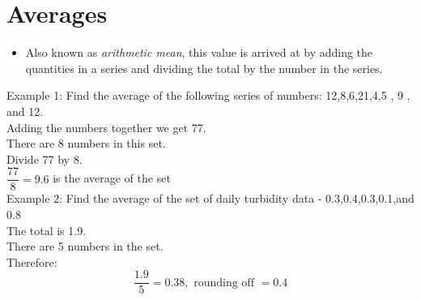 \section{Averages}
\begin{itemize}
\item Also known as \emph{arithmetic mean}, this value is arrived at by adding the quantities in a series and dividing the total by the number in the series.
\end{itemize}
Example 1: Find the average of the following series of numbers: 12,8,6,21,4,5 , 9 , and 12.\\
Adding the numbers together we get 77.\\
There are 8 numbers in this set.\\
Divide 77 by 8.\\

$\dfrac{77}{8}=9.6$ is the average of the set\\

Example 2:  Find the average of the set of daily turbidity data - 0.3,0.4,0.3,0.1,and 0.8\\
The total is 1.9.\\
There are 5 numbers in the set.\\
Therefore:
$$
\dfrac{1.9}{5}=0.38, \text { rounding off }=0.4
$$






